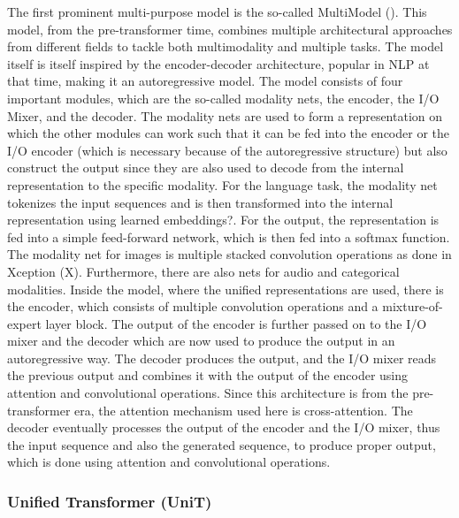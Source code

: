 \documentclass[
]{krantz}
\begin{document}
The first prominent multi-purpose model is the so-called MultiModel (\citet{Kaiser2017}). This model, from the pre-transformer time, combines multiple architectural approaches from different fields to tackle both multimodality and multiple tasks. The model itself is itself inspired by the encoder-decoder architecture, popular in NLP at that time, making it an autoregressive model.
The model consists of four important modules, which are the so-called modality nets, the encoder, the I/O Mixer, and the decoder.
The modality nets are used to form a representation on which the other modules can work such that it can be fed into the encoder or the I/O encoder (which is necessary because of the autoregressive structure) but also construct the output since they are also used to decode from the internal representation to the specific modality. For the language task, the modality net tokenizes the input sequences and is then transformed into the internal representation using learned embeddings?. For the output, the representation is fed into a simple feed-forward network, which is then fed into a softmax function. The modality net for images is multiple stacked convolution operations as done in Xception (X). Furthermore, there are also nets for audio and categorical modalities.
Inside the model, where the unified representations are used, there is the encoder, which consists of multiple convolution operations and a mixture-of-expert layer block. The output of the encoder is further passed on to the I/O mixer and the decoder which are now used to produce the output in an autoregressive way. The decoder produces the output, and the I/O mixer reads the previous output and combines it with the output of the encoder using attention and convolutional operations. Since this architecture is from the pre-transformer era, the attention mechanism used here is cross-attention.
The decoder eventually processes the output of the encoder and the I/O mixer, thus the input sequence and also the generated sequence, to produce proper output, which is done using attention and convolutional operations.

\hypertarget{unified-transformer-unit}{%
\subsubsection{Unified Transformer (UniT)}\label{unified-transformer-unit}}
\end{document}
